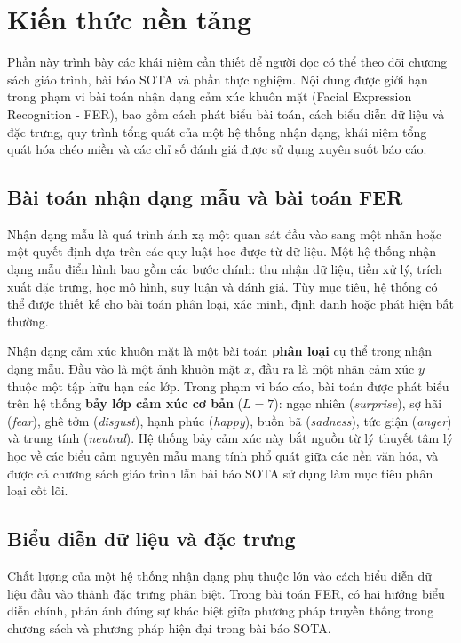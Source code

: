 \section{Kiến thức nền tảng}

Phần này trình bày các khái niệm cần thiết để người đọc có thể theo dõi chương sách giáo trình, bài báo SOTA và phần thực nghiệm. Nội dung được giới hạn trong phạm vi bài toán nhận dạng cảm xúc khuôn mặt (Facial Expression Recognition - FER), bao gồm cách phát biểu bài toán, cách biểu diễn dữ liệu và đặc trưng, quy trình tổng quát của một hệ thống nhận dạng, khái niệm tổng quát hóa chéo miền và các chỉ số đánh giá được sử dụng xuyên suốt báo cáo.

\subsection{Bài toán nhận dạng mẫu và bài toán FER}
Nhận dạng mẫu là quá trình ánh xạ một quan sát đầu vào sang một nhãn hoặc một quyết định dựa trên các quy luật học được từ dữ liệu. Một hệ thống nhận dạng mẫu điển hình bao gồm các bước chính: thu nhận dữ liệu, tiền xử lý, trích xuất đặc trưng, học mô hình, suy luận và đánh giá. Tùy mục tiêu, hệ thống có thể được thiết kế cho bài toán phân loại, xác minh, định danh hoặc phát hiện bất thường.

Nhận dạng cảm xúc khuôn mặt là một bài toán \textbf{phân loại} cụ thể trong nhận dạng mẫu. Đầu vào là một ảnh khuôn mặt $x$, đầu ra là một nhãn cảm xúc $y$ thuộc một tập hữu hạn các lớp. Trong phạm vi báo cáo, bài toán được phát biểu trên hệ thống \textbf{bảy lớp cảm xúc cơ bản} ($L = 7$): ngạc nhiên (\textit{surprise}), sợ hãi (\textit{fear}), ghê tởm (\textit{disgust}), hạnh phúc (\textit{happy}), buồn bã (\textit{sadness}), tức giận (\textit{anger}) và trung tính (\textit{neutral}). Hệ thống bảy cảm xúc này bắt nguồn từ lý thuyết tâm lý học về các biểu cảm nguyên mẫu mang tính phổ quát giữa các nền văn hóa, và được cả chương sách giáo trình lẫn bài báo SOTA sử dụng làm mục tiêu phân loại cốt lõi.

\subsection{Biểu diễn dữ liệu và đặc trưng}
Chất lượng của một hệ thống nhận dạng phụ thuộc lớn vào cách biểu diễn dữ liệu đầu vào thành đặc trưng phân biệt. Trong bài toán FER, có hai hướng biểu diễn chính, phản ánh đúng sự khác biệt giữa phương pháp truyền thống trong chương sách và phương pháp hiện đại trong bài báo SOTA.

